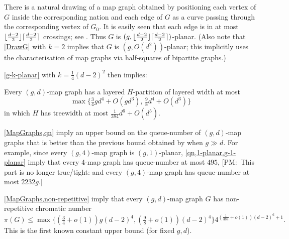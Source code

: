 \documentclass{patmorin}
\newcommand{\note}[2]{{\color{red}[#1:~#2]}}
\DeclareMathOperator{\qn}{qn}
\DeclarePairedDelimiter{\ceil}{\lceil}{\rceil}
\DeclarePairedDelimiter{\floor}{\lfloor}{\rfloor}
\renewcommand{\le}{\leqslant}
\begin{document}
There is a natural drawing of a map graph obtained by positioning each vertex of $G$ inside the corresponding nation and each edge of $G$ as a curve passing through the corresponding vertex of $G_0$. It is easily seen that each edge is in at most $\floor{\frac{d-2}{2}}\ceil{\frac{d-2}{2}}$ crossings; see \citet[Page~4]{dujmovic.eppstein.ea:structure}. Thus $G$ is $(g,\floor{\frac{d-2}{2}}\ceil{\frac{d-2}{2}})$-planar. (Also note that \cref{DrawG} with $k=2$ implies that $G$ is $(g, O(d^{2}) )$-planar; this implicitly uses the characterisation of map graphs via half-squares of bipartite graphs.)\ %

\cref{g-k-planar} with $k=\frac14 (d-2)^2$ then implies:


\begin{prop}
\label{MapGraphs}
Every $(g,d)$-map graph has a layered $H$-partition of layered width at most 
$$\max\{\tfrac34 gd^4 + O(gd^3), \, \tfrac{9}{8}d^4 +O(d^3) \}$$ 
in which $H$ has treewidth at most 
$\tfrac{1}{384} d^6 + O(d^5) $.
\end{prop}


\cref{MapGraphs,qn} imply an upper bound on the queue-number of $(g,d)$-map graphs that is better than the previous bound obtained by \citet{dujmovic.joret.ea:planar} when $g\gg d$. For example, since every $(g,4)$-map graph is $(g,1)$-planar, \cref{qn,1-planar,g-1-planar} imply that every 4-map graph has queue-number at most $495$, 
\note{PM}{This part is no longer true/tight: and every $(g,4)$-map graph has queue-number at most $2232 g$.}

\cref{MapGraphs,non-repetitive} imply that every $(g,d)$-map graph $G$ has non-repetitive chromatic number 
$$\pi(G)\le\max\{(\tfrac{3}{4}+o(1)) g(d-2)^4, (\tfrac{9}{8}+o(1)) (d-2)^4\} 4^{ (\frac{1}{384}+o(1))(d-2)^6+1}.$$
This is the first known constant upper bound (for fixed $g,d$). 
\end{document}
